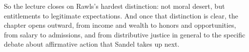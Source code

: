 So the lecture closes on Rawls's hardest distinction: not moral desert, but entitlements to legitimate expectations. And once that distinction is clear, the chapter opens outward, from income and wealth to honors and opportunities, from salary to admissions, and from distributive justice in general to the specific debate about affirmative action that Sandel takes up next.